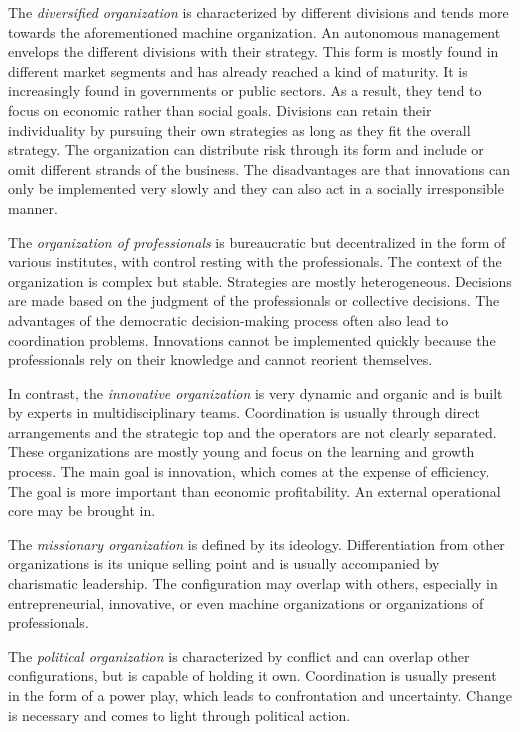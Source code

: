 \documentclass[a4paper,12pt]{article}
\begin{document}
The \emph{diversified organization} is characterized by different divisions
and tends more towards the aforementioned machine organization. An autonomous
management envelops the different divisions with their strategy. This form is
mostly found in different market segments and has already reached a kind of
maturity. It is increasingly found in governments or public sectors. As a
result, they tend to focus on economic rather than social goals. Divisions can
retain their individuality by pursuing their own strategies as long as they
fit the overall strategy. The organization can distribute risk through its
form and include or omit different strands of the business. The disadvantages
are that innovations can only be implemented very slowly and they can also act
in a socially irresponsible manner.

The \emph{organization of professionals} is bureaucratic but decentralized in
the form of various institutes, with control resting with the professionals.
The context of the organization is complex but stable. Strategies are mostly
heterogeneous. Decisions are made based on the judgment of the professionals
or collective decisions. The advantages of the democratic decision-making
process often also lead to coordination problems. Innovations cannot be
implemented quickly because the professionals rely on their knowledge and
cannot reorient themselves.

In contrast, the \emph{innovative organization} is very dynamic and organic
and is built by experts in multidisciplinary teams. Coordination is usually
through direct arrangements and the strategic top and the operators are not
clearly separated. These organizations are mostly young and focus on the
learning and growth process. The main goal is innovation, which comes at the
expense of efficiency. The goal is more important than economic profitability.
An external operational core may be brought in.

The \emph{missionary organization} is defined by its ideology. Differentiation
from other organizations is its unique selling point and is usually
accompanied by charismatic leadership. The configuration may overlap with
others, especially in entrepreneurial, innovative, or even machine
organizations or organizations of professionals.

The \emph{political organization} is characterized by conflict and can overlap
other configurations, but is capable of holding it own. Coordination is
usually present in the form of a power play, which leads to confrontation and
uncertainty. Change is necessary and comes to light through political action.
\end{document}
